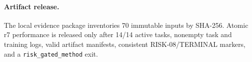 \paragraph{Artifact release.}
The local evidence package inventories 70 immutable inputs by SHA-256.
Atomic r7 performance is released only after 14/14 active tasks,
nonempty task and training logs, valid artifact manifests, consistent
RISK-08/TERMINAL markers, and a \texttt{risk\_gated\_method} exit.
